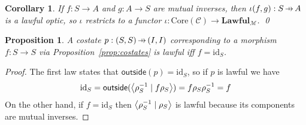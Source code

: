 \documentclass[11pt,letterpaper]{article}
\theoremstyle{plain}
\newtheorem{proposition}[theorem]{Proposition}
\newtheorem{corollary}[theorem]{Corollary}
\theoremstyle{definition}
\newcommand{\C}{\mathscr{C}}
\newcommand{\M}{\mathscr{M}}
\newcommand{\Lawful}{\mathbf{Lawful}}
\newcommand{\id}{\mathrm{id}}
\newcommand{\rep}[2]{{\ensuremath \left\langle #1 \mid #2 \right\rangle}}
\newcommand{\outside}{\mathsf{outside}}
\newcommand{\hto}{\ensuremath{\,\mathaccent\shortmid\rightarrow\,}}
\begin{document}
\begin{corollary}\label{cor:iota-lawful}
  If $f : S \to A$ and $g : A \to S$ are mutual inverses, then $\iota(f, g) : S \hto A$ is a lawful optic, so $\iota$ restricts to a functor $\iota : \mathrm{Core}(\C) \to \Lawful_\M$. \qed
\end{corollary}

\begin{proposition}
A costate $p : (S, S) \hto (I, I)$ corresponding to a morphism $f : S \to S$ via Proposition~\ref{prop:costates} is lawful iff $f = \id_S$.
\end{proposition}
\begin{proof}
The first law states that $\outside(p) = \id_S$, so if $p$ is lawful we have
\[  \id_S = \outside(\rep{\rho_S^{-1}}{f \rho_S}) =  f \rho_S\rho_S^{-1} = f \]
On the other hand, if $f  = \id_S$ then $\rep{\rho_S^{-1}}{\rho_S}$ is lawful because its components are mutual inverses.
\end{proof}
\end{document}
